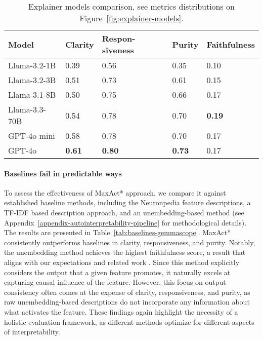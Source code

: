 \begin{table}[t]
\scriptsize
\centering
\begin{tabular}{p{1.6cm}p{1cm}p{1cm}p{1cm}p{1cm}} 
Model                 &   Clarity     & Respon-siveness & Purity        & Faithfulness \\ \hline \hline 
Llama-3.2-1B  &    0.39       &   0.56          &  0.35         &  0.10  \\  
Llama-3.2-3B  &    0.51       &   0.73          &  0.61         &  0.15  \\ 
Llama-3.1-8B  &    0.50       &   0.75          &  0.66         &  0.17   \\ 
Llama-3.3-70B &    0.54       &   0.78          &  0.70         &  \textbf{0.19}  \\ 
GPT-4o mini           &    0.58       &   0.78          &  0.70         &  0.17  \\ 
GPT-4o                &    \textbf{0.61}       &   \textbf{0.80}          &  \textbf{0.73 }        &  0.17  \\ \hline

\end{tabular}
\caption{Explainer models comparison, see metrics distributions on Figure~\ref{fig:explainer-models}. }
\label{tab:comparison-explainer-models}
\end{table}


\paragraph{Baselines fail in predictable ways}
To assess the effectiveness of MaxAct* approach, we compare it against established baseline methods, including the Neuronpedia feature descriptions, a TF-IDF \cite{ramos2003using, salton1988term} based description approach, and an unembedding-based method \cite{bloom2024understandingfeatureslogitlens} (see Appendix~\ref{appendix-autointerpretability-pipeline} for methodological details). The results are presented in Table~\ref{tab:baselines-gemmascope}.
MaxAct* consistently outperforms baselines in clarity, responsiveness, and purity. Notably, the unembedding method achieves the highest faithfulness score, a result that aligns with our expectations and related work \cite{gurarieh2025enhancingautomatedinterpretabilityoutputcentric}. Since this method explicitly considers the output that a given feature promotes, it naturally excels at capturing causal influence of the feature. However, this focus on output consistency often comes at the expense of clarity, responsiveness, and purity, as raw unembedding-based descriptions do not incorporate any information about what activates the feature.
These findings again highlight the necessity of a holistic evaluation framework, as different methods optimize for different aspects of interpretability. 


